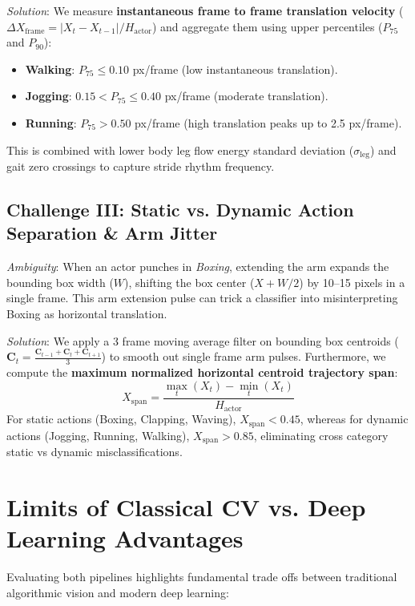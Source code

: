 \documentclass[11pt,a4paper]{article}
\begin{document}
\textit{Solution}: We measure \textbf{instantaneous frame to frame translation velocity} ($\Delta X_{\text{frame}} = |X_t - X_{t-1}| / H_{\text{actor}}$) and aggregate them using upper percentiles ($P_{75}$ and $P_{90}$):
\begin{itemize}
    \item \textbf{Walking}: $P_{75} \le 0.10$ px/frame (low instantaneous translation).
    \item \textbf{Jogging}: $0.15 < P_{75} \le 0.40$ px/frame (moderate translation).
    \item \textbf{Running}: $P_{75} > 0.50$ px/frame (high translation peaks up to 2.5 px/frame).
\end{itemize}
This is combined with lower body leg flow energy standard deviation ($\sigma_{\text{leg}}$) and gait zero crossings to capture stride rhythm frequency.

\subsection{Challenge III: Static vs. Dynamic Action Separation \& Arm Jitter}
\textit{Ambiguity}: When an actor punches in \textit{Boxing}, extending the arm expands the bounding box width ($W$), shifting the box center ($X + W/2$) by 10--15 pixels in a single frame. This arm extension pulse can trick a classifier into misinterpreting Boxing as horizontal translation.

\textit{Solution}: We apply a 3 frame moving average filter on bounding box centroids ($\mathbf{C}_t = \frac{\mathbf{C}_{t-1} + \mathbf{C}_t + \mathbf{C}_{t+1}}{3}$) to smooth out single frame arm pulses. Furthermore, we compute the \textbf{maximum normalized horizontal centroid trajectory span}:
\begin{equation}
    X_{\text{span}} = \frac{\max_{t} (X_t) - \min_{t} (X_t)}{H_{\text{actor}}}
\end{equation}
For static actions (Boxing, Clapping, Waving), $X_{\text{span}} < 0.45$, whereas for dynamic actions (Jogging, Running, Walking), $X_{\text{span}} > 0.85$, eliminating cross category static vs dynamic misclassifications.

\section{Limits of Classical CV vs. Deep Learning Advantages}
Evaluating both pipelines highlights fundamental trade offs between traditional algorithmic vision and modern deep learning:
\end{document}
